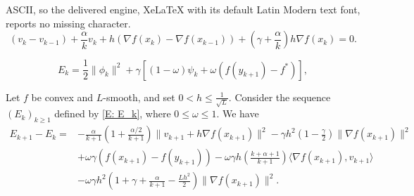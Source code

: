 \documentclass[10pt,a4paper]{amsart}
\begin{document}
ASCII, so the delivered engine, XeLaTeX with its default Latin Modern text font, reports no missing character.
\begin{equation}\label{inertial_iterates}
( v_k - v_{k-1} ) + \frac{\alpha}{k}v_k + h\left( \nabla f(x_k) - \nabla f(x_{k-1}) \right) + \left( \gamma + \frac{\alpha}{k} \right) h \nabla f(x_k) = 0.
\end{equation}

\begin{equation}\label{E: E_k}
E_k = \frac{1}{2}\| \phi_k \|^2 + \gamma\left[ (1-\omega)\psi_k + \omega\left( f(y_{k+1})-f^* \right) \right],
\end{equation}

\begin{proposition} \label{P:Delta_Ek}
Let $f$ be convex and $L$-smooth, and set $0<h\le \frac{1}{\sqrt{L}}$. Consider the sequence $(E_k)_{k\ge 1}$ defined by \eqref{E: E_k}, where $0\le\omega\le 1$. We have  
\begin{align*}
E_{k+1} - E_k 
=&    -\tfrac{\alpha}{k+1}\left( 1 + \tfrac{\alpha/2}{k+1} \right)\| v_{k+1} + h\nabla f(x_{k+1}) \|^2
   -\gamma h^2 \left(1-\tfrac{\gamma}{2}\right)\| \nabla f(x_{k+1}) \|^2 \\
   & +\omega\gamma \left(f(x_{k+1}) - f(y_{k+1})  \right) 
   -\omega\gamma h\left(\tfrac{k+\alpha+1}{k+1}\right) \langle \nabla f(x_{k+1}), v_{k+1} \rangle \\
&  -\omega\gamma h^2 \left(1+\gamma+\tfrac{\alpha}{k+1}-\tfrac{L h^2}{2}\right)\| \nabla f(x_{k+1}) \|^2  .
\end{align*}
\end{proposition}
\end{document}
